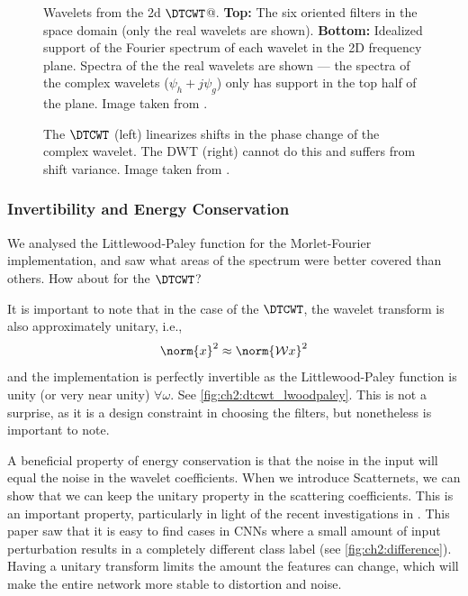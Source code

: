   \begin{figure}
    \centering
      \caption[Wavelets from the 2D $\DTCWT$]
              {Wavelets from the 2d $\DTCWT$@. \textbf{Top:} The six  oriented filters
      in the space domain (only the real wavelets are shown). \textbf{Bottom:}
      Idealized support of the Fourier spectrum of each wavelet in the 2D
      frequency plane. Spectra of the the real wavelets are shown --- the
      spectra of the complex wavelets ($\psi_h + j\psi_g$) only has support in the top
      half of the plane. Image taken from \cite{selesnick_dual-tree_2005}.}
      \label{fig:ch2:dtcwt_wavelets}
  \end{figure}
  \begin{figure}
    \centering
        {The $\DTCWT$ (left) linearizes shifts in the phase change of the complex
        wavelet. The DWT (right) cannot do this and suffers from shift variance. 
        Image taken from \cite{kingsbury_dual-tree_1998}.}
      \label{fig:ch2:dtcwt_shift_invariance}
  \end{figure}

  
\subsubsection{Invertibility and Energy Conservation}
  We analysed the Littlewood-Paley function for the Morlet-Fourier
  implementation, and saw what areas of the spectrum were better covered than
  others. How about for the $\DTCWT$?

  It is important to note that in the case of the $\DTCWT$, the wavelet
  transform is also approximately unitary, i.e.,\
  \begin{equation}
    \norm{x}^2 \approx \norm{\mathcal{W}x}^2
  \end{equation}
  and the implementation is perfectly invertible as the Littlewood-Paley
  function is unity (or very near unity) $\forall \omega$. See
  \autoref{fig:ch2:dtcwt_lwoodpaley}. This is not a surprise, as it is a design
  constraint in choosing the filters, but nonetheless is important to note. 

  A beneficial property of energy conservation is that the noise in the input
  will equal the noise in the wavelet coefficients. When we introduce
  Scatternets, we can show that we can keep the unitary property in the
  scattering coefficients. This is an important property, particularly in light
  of the recent investigations in \cite{szegedy_intriguing_2013}. This paper
  saw that it is easy to find cases in CNNs where a small amount of input
  perturbation results in a completely different class label (see
  \autoref{fig:ch2:difference}). Having a unitary transform limits the
  amount the features can change, which will make the entire network more
  stable to distortion and noise.

